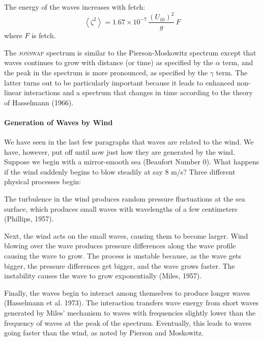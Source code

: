 The energy of the waves increases with fetch:
\begin{equation}
\left< \zeta ^{2}\right> = 1.67 \times 10^{-7}\, \frac{\left( U_{10} \right)^{2} }{g}  \, F
\end{equation}
where $F$ is fetch.

The \textsc{jonswap} spectrum is similar to the Pierson-Moskowitz spectrum
except that waves continues to grow with distance (or time) as specified by the
$\alpha$ term, and the peak in the spectrum is more pronounced, as specified by the
$\gamma$ term. The latter turns out to be particularly important because it
leads to enhanced non-linear interactions and a spectrum that changes in time
according to the theory of Hasselmann (1966).

\paragraph{Generation of Waves by Wind}
We have seen in the
last few paragraphs that waves are related to the wind. We have, however, put off
until now just how they are generated by the wind. Suppose we begin with a
mirror-smooth sea (Beaufort Number 0). What happens if the wind suddenly begins to
blow steadily at say 8 m/s? Three different physical processes begin:

\begin{enumerate}
\vitem
The turbulence in the wind produces random pressure fluctuations
at the sea surface, which produces small waves with wavelengths of a few
centimeters (Phillips, 1957).

\vitem
Next, the wind acts on the small waves, causing them to become larger. Wind
blowing over the wave produces pressure differences along the wave profile
causing the wave to grow. The process is unstable because, as the wave gets
bigger, the pressure differences get bigger, and the wave grows faster. The
instability causes the wave to grow exponentially (Miles, 1957).

\vitem
Finally, the waves begin to interact among themselves to produce longer
waves (Hasselmann et al. 1973). The interaction transfers wave energy
from short waves generated by Miles' mechanism to waves with frequencies slightly
lower than the frequency of waves at the peak of the spectrum.
Eventually, this leads to waves going faster than the wind, as noted by Pierson
and Moskowitz.

\end{enumerate}

